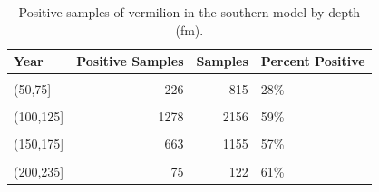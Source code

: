 \documentclass[11pt,
  english,
]{article}
\begin{document}
\begin{table}

\caption{\label{tab:tab-depth-nwfschl}Positive samples of vermilion in the southern model by depth (fm).}
\centering
\begin{tabular}[t]{lrrl}
\toprule
Year & Positive Samples & Samples & Percent Positive\\
\midrule
\cellcolor{gray!6}{(0,50]} & \cellcolor{gray!6}{85} & \cellcolor{gray!6}{295} & \cellcolor{gray!6}{29\%}\\
(50,75] & 226 & 815 & 28\%\\
\cellcolor{gray!6}{(75,100]} & \cellcolor{gray!6}{1697} & \cellcolor{gray!6}{3847} & \cellcolor{gray!6}{44\%}\\
(100,125] & 1278 & 2156 & 59\%\\
\cellcolor{gray!6}{(125,150]} & \cellcolor{gray!6}{917} & \cellcolor{gray!6}{1594} & \cellcolor{gray!6}{58\%}\\
\addlinespace
(150,175] & 663 & 1155 & 57\%\\
\cellcolor{gray!6}{(175,200]} & \cellcolor{gray!6}{234} & \cellcolor{gray!6}{456} & \cellcolor{gray!6}{51\%}\\
(200,235] & 75 & 122 & 61\%\\
\bottomrule
\end{tabular}
\end{table}
\end{document}
